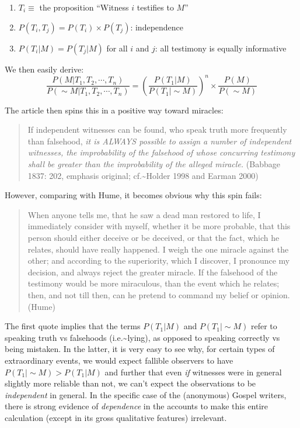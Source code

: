 \documentclass{tufte-book}
\begin{document}
\begin{enumerate}
\def\labelenumi{\arabic{enumi}.}
\itemsep1pt\parskip0pt
\item
  $T_i\equiv$ the proposition ``Witness $i$ testifies to $M$''
\item
  $P(T_i,T_j) = P(T_i)\times P(T_j)$: independence
\item
  $P(T_i|M)=P(T_j|M)$ for all $i$ and $j$: all testimony is
  equally informative
\end{enumerate}

We then easily derive: \[
\frac{P(M|T_1,T_2,\cdots,T_n)}{P(\sim\!M|T_1,T_2,\cdots,T_n)} = \left(\frac{P(T_1|M)}{P(T_1|\sim\!M)}\right)^n \times \frac{P(M)}{P(\sim\!M)}
\]

The article then spins this in a positive way toward miracles:

\begin{quote}
If independent witnesses can be found, who speak truth more frequently
than falsehood, \emph{it is ALWAYS possible to
assign a number of independent witnesses, the improbability of the
falsehood of whose concurring testimony shall be greater than the
improbability of the alleged miracle.} (Babbage 1837: 202, emphasis
original; cf.\textasciitilde{}Holder 1998 and Earman 2000)
\end{quote}

However, comparing with Hume, it becomes obvious why this spin fails:

\begin{quote}
When anyone tells me, that he saw a dead man restored to life, I
immediately consider with myself, whether it be more probable, that this
person should either deceive or be deceived, or that the fact, which he
relates, should have really happened. I weigh the one miracle against
the other; and according to the superiority, which I discover, I
pronounce my decision, and always reject the greater miracle. If the
falsehood of the testimony would be more miraculous, than the event
which he relates; then, and not till then, can he pretend to command my
belief or opinion. (Hume)
\end{quote}

The first quote implies that the terms \(P(T_1|M)\) and
\(P(T_1|\sim\!M)\) refer to speaking truth vs falsehoods
(i.e.\textasciitilde{}lying), as opposed to speaking correctly vs being
mistaken. In the latter, it is very easy to see why, for certain types
of extraordinary events, we would expect fallible observers to have
\(P(T_1|\sim\!M)>P(T_1|M)\) and further that even \emph{if} witnesses
were in general slightly more reliable than not, we can't expect the
observations to be \emph{independent} in general. In the specific case
of the (anonymous) Gospel writers, there is strong evidence of
\emph{dependence} in the accounts to make this entire calculation
(except in its gross qualitative features) irrelevant.
\end{document}
